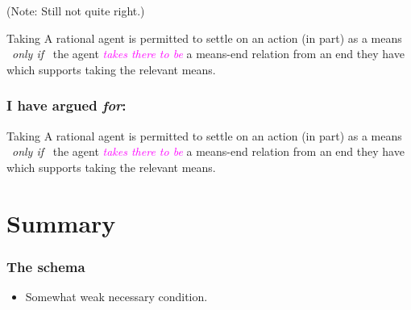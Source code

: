 \documentclass[noamssymb,
]{beamer} %
\newcommand{\hozlinedash}[0]{%
  \noindent\hdashrule[0.5ex][c]{\textwidth}{.1pt}{2.5pt}
}
\begin{document}
\begin{frame}
  (Note: Still not quite right.)

  \hozlinedash

  {\footnotesize
    \begin{block}{Taking}
      A rational agent is permitted to settle on an action (in part) as a means
      \newline
      \mbox{ }\hfill\emph{only if}\hfill\mbox{ }
      \newline
      the agent \textcolor{fuchsia}{\emph{takes there to be}}  a means-end relation from an end they have which supports taking the relevant means.
    \end{block}
  }
\end{frame}

\begin{frame}
  \frametitle{I have argued \emph{for}:}
    \begin{block}{Taking}
    A rational agent is permitted to settle on an action (in part) as a means
    \newline
    \mbox{ }\hfill\emph{only if}\hfill\mbox{ }
    \newline
    the agent \textcolor{fuchsia}{\emph{takes there to be}} a means-end relation from an end they have which supports taking the relevant means.
  \end{block}
\end{frame}

\section{Summary}
\label{sec:summary}


\begin{frame}
  \frametitle{The schema}



  \begin{itemize}
  \item Somewhat weak necessary condition.
    
  \end{itemize}
\end{frame}
\end{document}
